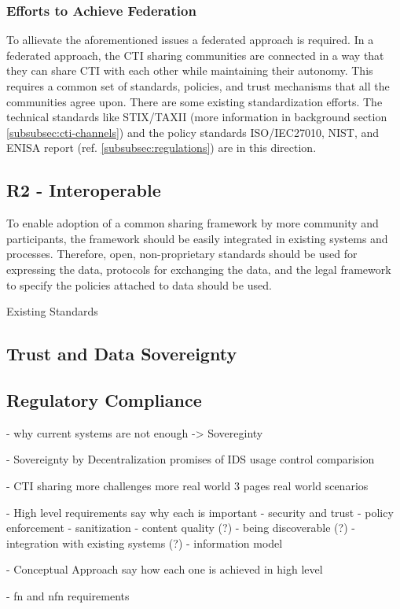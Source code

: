 \subsubsection{Efforts to Achieve Federation}
To allievate the aforementioned issues a federated approach is required. In a federated approach, the CTI sharing communities are connected in a way that they can share CTI with each other while maintaining their autonomy. This requires a common set of standards, policies, and trust mechanisms that all the communities agree upon. There are some existing standardization efforts. The technical standards like STIX/TAXII (more information in background section \ref{subsubsec:cti-channels}) and the policy standards ISO/IEC27010, NIST, and ENISA report (ref. \ref{subsubsec:regulations}) are in this direction. 

\subsection{R2 - Interoperable}
To enable adoption of a common sharing framework by more community and participants, the framework should be easily integrated in existing systems and processes. Therefore, open, non-proprietary standards should be used for expressing the data, protocols for exchanging the data, and the legal framework to specify the policies attached to data should be used.

Existing Standards
\subsection{Trust and Data Sovereignty}
\subsection{Regulatory Compliance}
- why current systems are not enough -> Sovereginty

- Sovereignty by Decentralization
  promises of IDS
  usage control
  comparision

- CTI sharing more challenges more real world 
  3 pages
  real world scenarios

- High level requirements
say why each is important
    - security and trust
    - policy enforcement
    - sanitization
    - content quality (?)
    - being discoverable (?)
    - integration with existing systems (?)
    - information model

- Conceptual Approach
    say how each one is achieved in high level

- fn and nfn requirements

